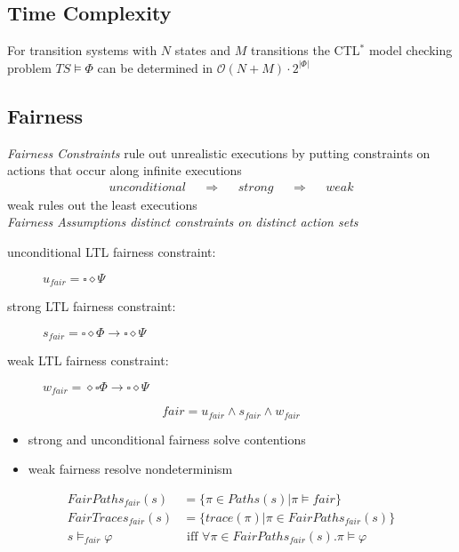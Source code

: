 \documentclass[a4paper, 10pt]{article}
\begin{document}
\subsection{Time Complexity}

For transition systems with $N$ states and $M$ transitions the CTL$^*$ model checking problem $TS\models\Phi$ can be determined in $\mathcal{O}(N+M)\cdot2^{|\Phi|}$

\subsection{Fairness}
\begin{mdframed}[roundcorner=5pt,
subtitlebelowline=false,subtitleaboveline=false,
subtitlebackgroundcolor=blue!30,
frametitlerule=true,
frametitlebackgroundcolor=blue!30,
frametitle={Fairness}
]
\emph{Fairness Constraints} \follows rule out unrealistic executions by putting constraints on actions that occur along infinite executions
\begin{align*}
unconditional && \Rightarrow && strong && \Rightarrow && weak
\end{align*}
weak rules out the least executions\\
\emph{Fairness Assumptions \follows distinct constraints on distinct action sets}
\begin{description}
    \item[unconditional LTL fairness constraint:] $u_{fair} = \square\diamond\Psi$
    \item[strong LTL fairness constraint:] $s_{fair}=\square\diamond\Phi\longrightarrow\square\diamond\Psi$
    \item[weak LTL fairness constraint:] $w_{fair}=\diamond\square\Phi\longrightarrow\square\diamond\Psi$
\end{description}
\[ fair = u_{fair} \wedge s_{fair} \wedge w_{fair} \]
\begin{itemize}
    \item strong and unconditional fairness \follows solve contentions
    \item weak fairness \follows resolve nondeterminism
\end{itemize}
\begin{align*}
FairPaths_{fair}(s) &= \{\pi\in Paths(s) | \pi\models fair\} \\
FairTraces_{fair}(s) &= \{trace(\pi)|\pi\in FairPaths_{fair}(s)\} \\
s\models_{fair}\varphi &\text{ iff } \forall\pi\in FairPaths_{fair}(s).\pi\models \varphi \\

\end{align*}
\end{mdframed}
\end{document}
